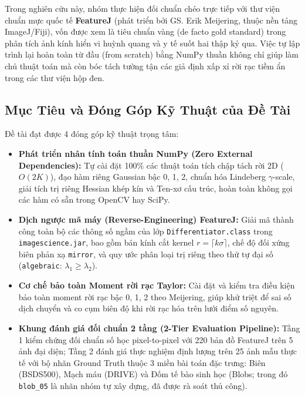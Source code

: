 \documentclass[conference]{IEEEtran}
\begin{document}
Trong nghiên cứu này, nhóm thực hiện đối chuẩn chéo trực tiếp với thư viện chuẩn mực quốc tế \textbf{FeatureJ} (phát triển bởi GS. Erik Meijering, thuộc nền tảng ImageJ/Fiji), vốn được xem là tiêu chuẩn vàng (de facto gold standard) trong phân tích ảnh kính hiển vi huỳnh quang và y tế suốt hai thập kỷ qua. Việc tự lập trình lại hoàn toàn từ đầu (from scratch) bằng NumPy thuần không chỉ giúp làm chủ thuật toán mà còn bóc tách tường tận các giả định xấp xỉ rời rạc tiềm ẩn trong các thư viện hộp đen.

\subsection{Mục Tiêu và Đóng Góp Kỹ Thuật của Đề Tài}
Đề tài đạt được 4 đóng góp kỹ thuật trọng tâm:
\begin{itemize}
    \item \textbf{Phát triển nhân tính toán thuần NumPy (Zero External Dependencies):} Tự cài đặt 100\% các thuật toán tích chập tách rời 2D ($O(2K)$), đạo hàm riêng Gaussian bậc 0, 1, 2, chuẩn hóa Lindeberg $\gamma$-scale, giải tích trị riêng Hessian khép kín và Ten-xơ cấu trúc, hoàn toàn không gọi các hàm có sẵn trong OpenCV hay SciPy.
    \item \textbf{Dịch ngược mã máy (Reverse-Engineering) FeatureJ:} Giải mã thành công toàn bộ các thông số ngầm của lớp \texttt{Differentiator.class} trong \texttt{imagescience.jar}, bao gồm bán kính cắt kernel $r = \lceil k\sigma \rceil$, chế độ đối xứng biên phản xạ \texttt{mirror}, và quy ước phân loại trị riêng theo thứ tự đại số (\texttt{algebraic}: $\lambda_1 \ge \lambda_2$).
    \item \textbf{Cơ chế bảo toàn Moment rời rạc Taylor:} Cài đặt và kiểm tra điều kiện bảo toàn moment rời rạc bậc 0, 1, 2 theo Meijering, giúp khử triệt để sai số dịch chuyển và co cụm biên độ khi rời rạc hóa trên lưới điểm số nguyên.
    \item \textbf{Khung đánh giá đối chuẩn 2 tầng (2-Tier Evaluation Pipeline):} Tầng 1 kiểm chứng đối chuẩn số học pixel-to-pixel với 220 bản đồ FeatureJ trên 5 ảnh đại diện; Tầng 2 đánh giá thực nghiệm định lượng trên 25 ảnh mẫu thực tế với bộ nhãn Ground Truth thuộc 3 miền bài toán đặc trưng: Biên (BSDS500), Mạch máu (DRIVE) và Đốm tế bào sinh học (Blobs; trong đó \texttt{blob\_05} là nhãn nhóm tự xây dựng, đã được rà soát thủ công).
\end{itemize}
\end{document}
